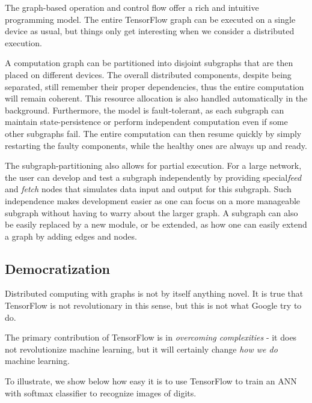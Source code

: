 \documentclass[12pt]{article}  %
\begin{document}
The graph-based operation and control flow offer a rich and intuitive programming model. The entire TensorFlow graph can be executed on a single device as usual, but things only get interesting when we consider a distributed execution.

A computation graph can be partitioned into disjoint subgraphs that are then placed on different devices. The overall distributed components, despite being separated, still remember their proper dependencies, thus the entire computation will remain coherent. This resource allocation is also handled automatically in the background. Furthermore, the model is fault-tolerant, as each subgraph can maintain state-persistence or perform independent computation even if some other subgraphs fail. The entire computation can then resume quickly by simply restarting the faulty components, while the healthy ones are always up and ready.

The subgraph-partitioning also allows for partial execution. For a large network, the user can develop and test a subgraph independently by providing special\emph{feed} and \emph{fetch} nodes that simulates data input and output for this subgraph. Such independence makes development easier as one can focus on a more manageable subgraph without having to warry about the larger graph. A subgraph can also be easily replaced by a new module, or be extended, as how one can easily extend a graph by adding edges and nodes.


\subsection{Democratization}
Distributed computing with graphs is not by itself anything novel. It is true that TensorFlow is not revolutionary in this sense, but this is not what Google try to do.

The primary contribution of TensorFlow is in \emph{overcoming complexities} - it does not revolutionize machine learning, but it will certainly change \emph{how we do} machine learning.

To illustrate, we show below how easy it is to use TensorFlow to train an ANN with softmax classifier to recognize images of digits.
\end{document}
